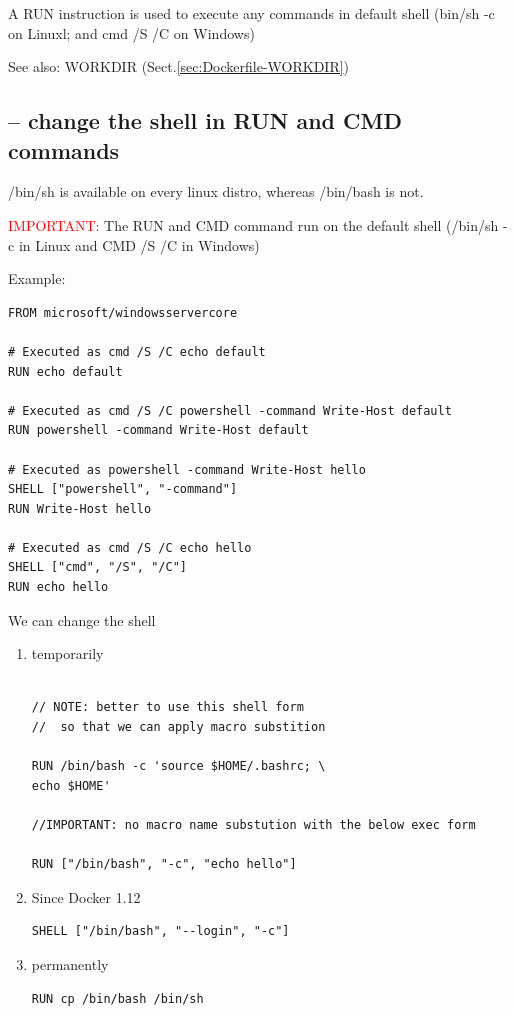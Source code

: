 A RUN instruction is used to execute any commands in default shell (bin/sh -c on
Linuxl; and cmd /S /C on Windows)

See also: WORKDIR (Sect.\ref{sec:Dockerfile-WORKDIR})


\subsection{-- change the shell in RUN and CMD commands}

/bin/sh is available on every linux distro, whereas /bin/bash is not.

\textcolor{red}{IMPORTANT:} The RUN and CMD command run on the default shell
(/bin/sh -c in Linux and CMD /S /C in Windows)

Example:
\begin{verbatim}
FROM microsoft/windowsservercore

# Executed as cmd /S /C echo default
RUN echo default

# Executed as cmd /S /C powershell -command Write-Host default
RUN powershell -command Write-Host default

# Executed as powershell -command Write-Host hello
SHELL ["powershell", "-command"]
RUN Write-Host hello

# Executed as cmd /S /C echo hello
SHELL ["cmd", "/S", "/C"]
RUN echo hello
\end{verbatim}

 
We can change the shell
\begin{enumerate}
  \item temporarily


\begin{verbatim}

// NOTE: better to use this shell form
//  so that we can apply macro substition

RUN /bin/bash -c 'source $HOME/.bashrc; \
echo $HOME'

//IMPORTANT: no macro name substution with the below exec form

RUN ["/bin/bash", "-c", "echo hello"]
\end{verbatim}
  
  \item 

Since Docker 1.12  
\begin{verbatim}
SHELL ["/bin/bash", "--login", "-c"]
\end{verbatim}


  \item permanently
  
  
\begin{verbatim}
RUN cp /bin/bash /bin/sh

\end{verbatim}
\end{enumerate}


